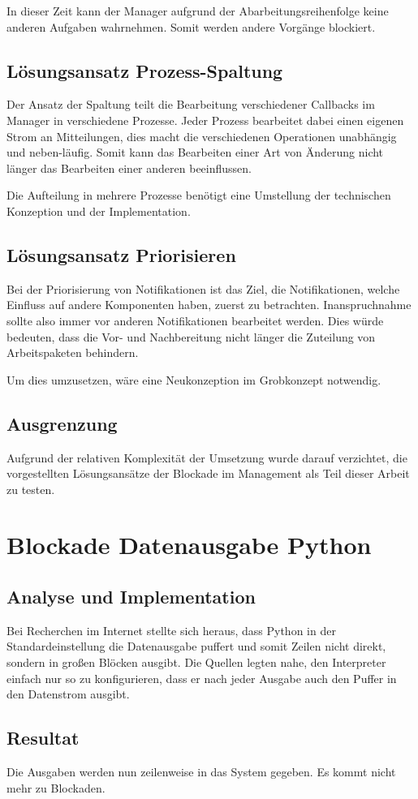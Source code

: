 In dieser Zeit kann der Manager aufgrund der Abarbeitungsreihenfolge
keine anderen Aufgaben wahrnehmen.
Somit werden andere Vorgänge blockiert.

\subsection{Lösungsansatz Prozess-Spaltung}

Der Ansatz der Spaltung teilt die Bearbeitung verschiedener Callbacks im Manager
in verschiedene Prozesse. Jeder Prozess bearbeitet dabei einen eigenen Strom an Mitteilungen, dies macht die verschiedenen Operationen unabhängig und neben-läufig.
Somit kann das Bearbeiten einer Art von Änderung nicht länger das Bearbeiten einer anderen beeinflussen.

Die Aufteilung in mehrere Prozesse benötigt eine Umstellung der technischen Konzeption und der Implementation.

\subsection{Lösungsansatz Priorisieren}

Bei der Priorisierung von Notifikationen ist das Ziel,
die Notifikationen, welche Einfluss auf andere Komponenten haben, zuerst zu betrachten.
Inanspruchnahme sollte also immer vor anderen Notifikationen bearbeitet werden.
Dies würde bedeuten, dass die Vor- und Nachbereitung nicht länger die Zuteilung von Arbeitspaketen behindern.

Um dies umzusetzen, wäre eine Neukonzeption im Grobkonzept notwendig.


\subsection{Ausgrenzung}

Aufgrund der relativen Komplexität der Umsetzung
wurde darauf verzichtet, die vorgestellten Lösungsansätze der Blockade im Management
als Teil dieser Arbeit zu testen.

\section{Blockade Datenausgabe Python}
\label{cha:opt:block-py-io}

\subsection{Analyse und Implementation}

Bei Recherchen im Internet stellte sich heraus,
dass Python in der Standardeinstellung die Datenausgabe puffert und somit Zeilen nicht direkt,
sondern in großen Blöcken ausgibt.
Die Quellen legten nahe, den Interpreter einfach nur so zu konfigurieren,
dass er nach jeder Ausgabe auch den Puffer in den Datenstrom ausgibt.

\subsection{Resultat}

Die Ausgaben werden nun zeilenweise in das System gegeben.
Es kommt nicht mehr zu Blockaden.
